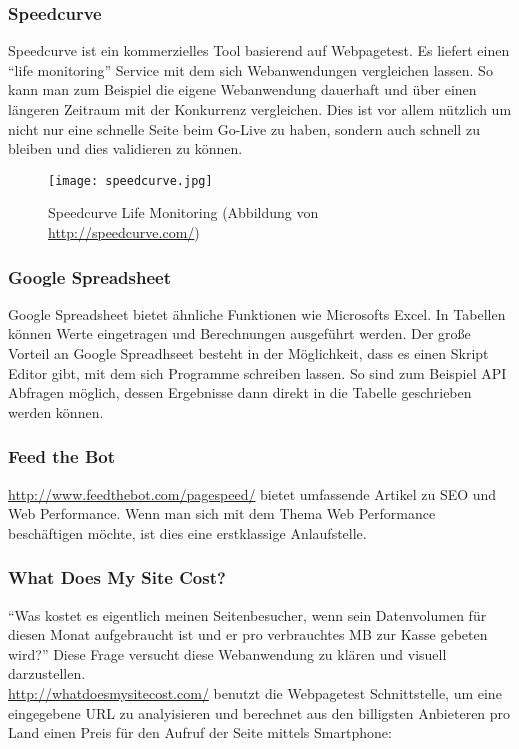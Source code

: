 

		\subsubsection{Speedcurve} %
		\label{ssub:speedcurve}
			Speedcurve ist ein kommerzielles Tool basierend auf Webpagetest. Es liefert einen "`life monitoring"' Service mit dem sich Webanwendungen vergleichen lassen. So kann man zum Beispiel die eigene Webanwendung dauerhaft und über einen längeren Zeitraum mit der Konkurrenz vergleichen. Dies ist vor allem nützlich um nicht nur eine schnelle Seite beim Go-Live zu haben, sondern auch schnell zu bleiben und dies validieren zu können.

			\begin{figure}[htbp]
				\begin{center}
					\texttt{[image: speedcurve.jpg]}
					\caption{Speedcurve Life Monitoring (Abbildung von \url{http://speedcurve.com/})}
					\label{fig:speedcurve}
				\end{center}
			\end{figure}


		\subsubsection{Google Spreadsheet} %
		\label{ssub:google_spreadsheet}
			Google Spreadsheet bietet ähnliche Funktionen wie Microsofts Excel. In Tabellen können Werte eingetragen und Berechnungen ausgeführt werden. Der große Vorteil an Google Spreadhseet besteht in der Möglichkeit, dass es einen Skript Editor gibt, mit dem sich Programme schreiben lassen. So sind zum Beispiel API Abfragen möglich, dessen Ergebnisse dann direkt in die Tabelle geschrieben werden können.		

		\subsubsection{Feed the Bot} %
		\label{ssub:feed_the_bot}
			\url{http://www.feedthebot.com/pagespeed/} bietet umfassende Artikel zu SEO und Web Performance. Wenn man sich mit dem Thema Web Performance beschäftigen möchte, ist dies eine erstklassige Anlaufstelle.


		\subsubsection{What Does My Site Cost?} %
		\label{ssub:what_does_my_site_cost}
			"`Was kostet es eigentlich meinen Seitenbesucher, wenn sein Datenvolumen für diesen Monat aufgebraucht ist und er pro verbrauchtes MB zur Kasse gebeten wird?"' Diese Frage versucht diese Webanwendung zu klären und visuell darzustellen.\\
			\url{http://whatdoesmysitecost.com/} benutzt die Webpagetest Schnittstelle, um eine eingegebene URL zu analyisieren und berechnet aus den billigsten Anbieteren pro Land einen Preis für den Aufruf der Seite mittels Smartphone:

